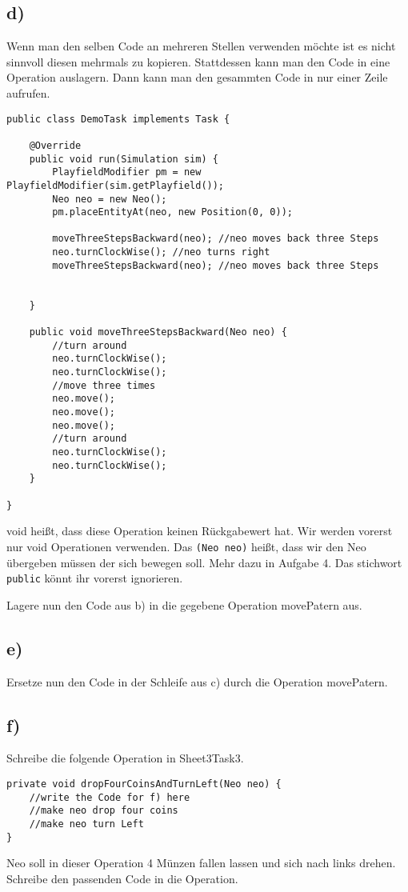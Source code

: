 \subsection*{d)}
	\begin{Infobox}[Operation]
		Wenn man den selben Code an mehreren Stellen verwenden möchte ist es nicht sinnvoll diesen mehrmals zu kopieren. Stattdessen kann man den Code in eine Operation auslagern. Dann kann man den gesammten Code in nur einer Zeile  aufrufen.
				\begin{lstlisting}
public class DemoTask implements Task {
    
    @Override
    public void run(Simulation sim) {
        PlayfieldModifier pm = new PlayfieldModifier(sim.getPlayfield());
        Neo neo = new Neo();
        pm.placeEntityAt(neo, new Position(0, 0));
     
        moveThreeStepsBackward(neo); //neo moves back three Steps
        neo.turnClockWise(); //neo turns right
        moveThreeStepsBackward(neo); //neo moves back three Steps
	
        
    }
    
    public void moveThreeStepsBackward(Neo neo) {
        //turn around
        neo.turnClockWise();
        neo.turnClockWise();
        //move three times
        neo.move();
        neo.move();
        neo.move();
        //turn around
        neo.turnClockWise();
        neo.turnClockWise();
    }
    
}
		\end{lstlisting}
void heißt, dass diese Operation keinen Rückgabewert hat. 
Wir werden vorerst nur void Operationen verwenden. 
Das \lstinline{(Neo neo)} heißt, dass wir den Neo übergeben müssen der sich bewegen soll. 
Mehr dazu in Aufgabe 4. 
Das stichwort \lstinline{public} könnt ihr vorerst ignorieren.
 	\end{Infobox}
Lagere nun den Code aus b) in die gegebene Operation movePatern aus.
\subsection*{e)}
Ersetze nun den Code in der Schleife aus c) durch die Operation movePatern.
\subsection*{f)}
Schreibe die folgende Operation in Sheet3Task3.
\begin{lstlisting}
private void dropFourCoinsAndTurnLeft(Neo neo) {
    //write the Code for f) here
    //make neo drop four coins
    //make neo turn Left
}
\end{lstlisting}
Neo soll in dieser Operation 4 Münzen fallen lassen und sich nach links drehen. Schreibe den passenden Code in die Operation.

